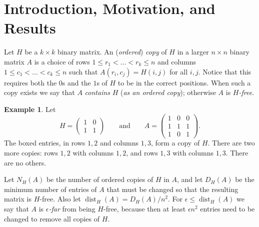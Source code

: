 \documentclass{article}
\DeclareMathOperator{\dist}{dist}
\theoremstyle{plain}
\theoremstyle{definition}
\newtheorem{example}{Example}
\begin{document}
\section*{Introduction, Motivation, and Results}
Let $H$ be a $k \times k$ binary matrix. An (\emph{ordered}) \emph{copy} of $H$ in a larger $n \times n$ binary matrix $A$ is a choice of rows $1 \le r_1 < \dots < r_k \le n$ and columns $1 \le c_1 < \dots < c_k \le n$ such that $A(r_i, c_j) = H(i, j)$ for all $i, j$. Notice that this requires both the $0$s and the $1$s of $H$ to be in the correct positions. When such a copy exists we say that $A$ \emph{contains} $H$ (\emph{as an ordered copy}); otherwise $A$ is \emph{$H$-free}.

\begin{example}\label{ex:copies}
Let
\[
    H = \begin{pmatrix} 1 & 0 \\1 & 1 \end{pmatrix}
    \qquad\text{and}\qquad
    A = \begin{pmatrix}
    \boxed{1} & 0 & \boxed{0} \\
    \boxed{1} & 1 & \boxed{1} \\
    1 & 0 & 1
    \end{pmatrix}.
\]
  The boxed entries, in rows $1, 2$ and columns $1, 3$, form a copy of $H$. There are two more copies: rows $1, 2$ with columns $1, 2$, and rows $1, 3$ with columns $1, 3$. There
  are no others.
  \end{example}

  Let $N_H(A)$ be the number of ordered copies of $H$ in $A$, and let $D_H(A)$ be the minimum
  number of entries of $A$ that must be changed so that the resulting matrix is $H$-free. Also let
  $\dist_H(A) = D_H(A)/n^2$. For $\epsilon \le \dist_H(A)$ we say that $A$ is
  \emph{$\epsilon$-far} from being $H$-free, because then at least $\epsilon n^2$ entries need to be
  changed to remove all copies of $H$.
\end{document}

